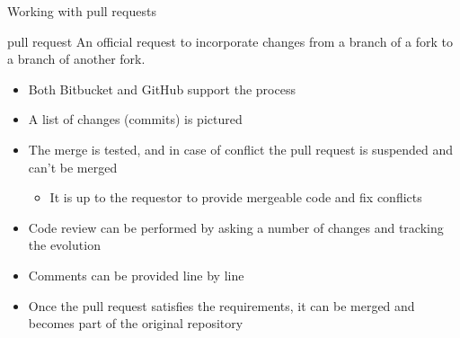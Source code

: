 \documentclass[presentation]{beamer}
\begin{document}
\begin{frame}{Working with pull requests}
    \begin{block}{pull request}
        An official request to incorporate changes from a branch of a fork to a branch of another fork.
    \end{block}
    \begin{itemize}
        \item Both Bitbucket and GitHub support the process
        \item A list of changes (commits) is pictured
        \item The merge is tested, and in case of conflict the pull request is suspended and can't be merged
        \begin{itemize}
            \item It is up to the requestor to provide mergeable code and fix conflicts
        \end{itemize}
        \item Code review can be performed by asking a number of changes and tracking the evolution
        \item Comments can be provided line by line
        \item Once the pull request satisfies the requirements, it can be merged and becomes part of the original repository
    \end{itemize}
\end{frame}

%   
%   
\end{document}
